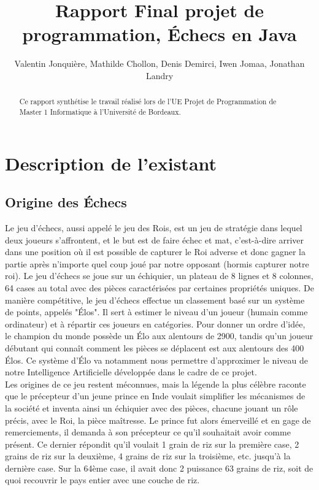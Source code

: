 \documentclass{article}
\author{
    Valentin Jonquière,
    Mathilde Chollon,
    Denis Demirci,
    Iwen Jomaa,
    Jonathan Landry
}
\title{Rapport Final projet de programmation, Échecs en Java}
\begin{document}
\maketitle

\pagebreak

\tableofcontents

\pagebreak
\begin{abstract}
    Ce rapport synthétise le travail réalisé lors de l'UE Projet de Programmation de Master 1 Informatique à l'Université de Bordeaux.
 \end{abstract}

\section{Description de l'existant}
\subsection{Origine des Échecs}
Le jeu d’échecs, aussi appelé le jeu des Rois, est un jeu de stratégie dans lequel deux joueurs s’affrontent,
et le but est de faire échec et mat, c’est-à-dire arriver dans une position où il est possible de capturer
le Roi adverse et donc gagner la partie après n’importe quel coup joué par notre opposant (hormis capturer notre roi).
Le jeu d’échecs se joue sur un échiquier, un plateau de 8 lignes et 8 colonnes, 64 cases au total avec des pièces
caractérisées par certaines propriétés uniques. De manière compétitive, le jeu d'échecs effectue un classement
basé sur un système de points, appelés "Élos". Il sert à estimer le niveau d'un joueur (humain comme ordinateur) et
à répartir ces joueurs en catégories. Pour donner un ordre d'idée, le champion du monde possède un Élo aux alentours de 2900,
tandis qu'un joueur débutant qui connaît comment les pièces se déplacent est aux alentours des 400 Élos. Ce système d'Élo
va notamment nous permettre d'approximer le niveau de notre Intelligence Artificielle développée dans le cadre de ce projet.\\
Les origines de ce jeu restent méconnues, mais la légende la plus célèbre raconte que le précepteur d’un jeune prince en Inde
voulait simplifier les mécanismes de la société et inventa ainsi un échiquier avec des pièces, chacune jouant un rôle précis,
avec le Roi, la pièce maîtresse. Le prince fut alors émerveillé et en gage de remerciements, il demanda à son précepteur ce
qu’il souhaitait avoir comme présent. Ce dernier répondit qu’il voulait 1 grain de riz sur la première case, 2 grains de riz
sur la deuxième, 4 grains de riz sur la troisième, etc. jusqu’à la dernière case. Sur la 64ème case, il avait donc
2 puissance 63 grains de riz, soit de quoi recouvrir le pays entier avec une couche de riz.
\end{document}

